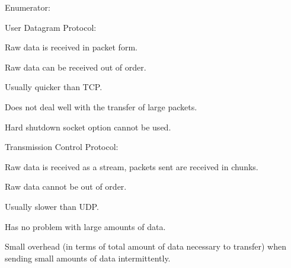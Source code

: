 \begin{Desc}
\item[Enumerator: ]\par
\begin{description}
\item[{\em 
\hypertarget{class_net_socket_simple_a31450636f6fb9ece239c50f616e0d7b0a01b7e644d632a43bbec04dbd373a1b34}{
UDP}
\label{class_net_socket_simple_a31450636f6fb9ece239c50f616e0d7b0a01b7e644d632a43bbec04dbd373a1b34}
}]User Datagram Protocol:
\begin{DoxyItemize}
\item Raw data is received in packet form.
\item Raw data can be received out of order.
\item Usually quicker than TCP.
\item Does not deal well with the transfer of large packets.
\item Hard shutdown socket option cannot be used. 
\end{DoxyItemize}\item[{\em 
\hypertarget{class_net_socket_simple_a31450636f6fb9ece239c50f616e0d7b0ad093d601c519b54e673755f915cd6467}{
TCP}
\label{class_net_socket_simple_a31450636f6fb9ece239c50f616e0d7b0ad093d601c519b54e673755f915cd6467}
}]Transmission Control Protocol:
\begin{DoxyItemize}
\item Raw data is received as a stream, packets sent are received in chunks.
\item Raw data cannot be out of order.
\item Usually slower than UDP.
\item Has no problem with large amounts of data.
\item Small overhead (in terms of total amount of data necessary to transfer) when sending small amounts of data intermittently. 
\end{DoxyItemize}\end{description}
\end{Desc}



